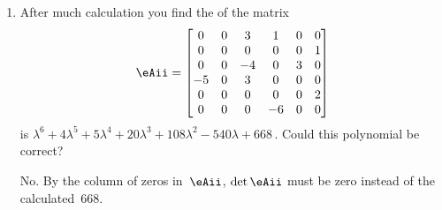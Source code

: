 \begin{example}
\begin{enumerate}
\item After much calculation you find the  of the matrix
\begin{equation*}
\eAii=\begin{bmatrix}0&0&3&1&0&0
\\0&0&0&0&0&1
\\0&0&-4&0&3&0
\\-5&0&3&0&0&0
\\0&0&0&0&0&2
\\0&0&0&-6&0&0\end{bmatrix}
\end{equation*}
is \(\lambda^6 +4\lambda^5 +5\lambda^4 +20\lambda^3 +108\lambda^2 -540\lambda+668\)\,.  
Could this polynomial be correct?
\begin{solution} 
No. By the column of zeros in~\(\eAii\), \(\det \eAii\) must be zero instead of the calculated~\(668\).
\end{solution}


\end{enumerate}
\end{example}
